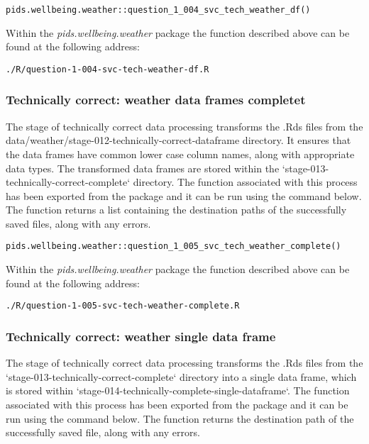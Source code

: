 \documentclass[12pt, oneside, openany]{book}
\begin{document}
\begin{verbatim}
pids.wellbeing.weather::question_1_004_svc_tech_weather_df()
\end{verbatim}

Within the \emph{pids.wellbeing.weather} package the function described above can be found at the following address:

\begin{verbatim}
./R/question-1-004-svc-tech-weather-df.R
\end{verbatim}

\subsubsection*{Technically correct: weather data frames completet}

The stage of technically correct data processing transforms the .Rds files from the data/weather/stage-012-technically-correct-dataframe directory. It ensures that the data frames have common lower case column names, along with appropriate data types. The transformed data frames are stored within the `stage-013-technically-correct-complete` directory. The function associated with this process has been exported from the package and it can be run using the command below. The function returns a list containing the destination paths of the successfully saved files, along with any errors.

\begin{verbatim}
pids.wellbeing.weather::question_1_005_svc_tech_weather_complete()
\end{verbatim}

Within the \emph{pids.wellbeing.weather} package the function described above can be found at the following address:

\begin{verbatim}
./R/question-1-005-svc-tech-weather-complete.R
\end{verbatim}

\subsubsection*{Technically correct: weather single data frame}

The stage of technically correct data processing transforms the .Rds files from the `stage-013-technically-correct-complete` directory into a single data frame, which is stored within `stage-014-technically-complete-single-dataframe`. The function associated with this process has been exported from the package and it can be run using the command below. The function returns the destination path of the successfully saved file, along with any errors.
\end{document}
